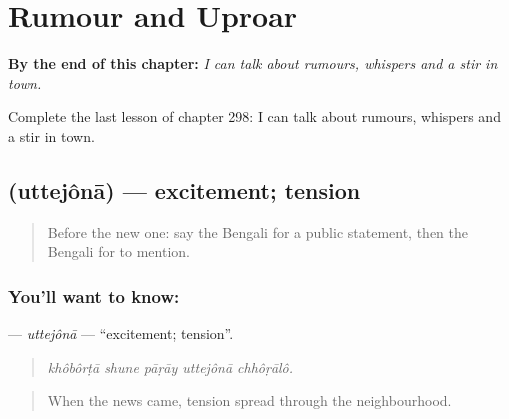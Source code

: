 
\chapter{Rumour and Uproar}
\label{ch:bn-rumour-and-uproar}

\begin{chapteropening}
\textbf{By the end of this chapter:} \emph{I can talk about rumours, whispers and a stir in town.}

Complete the last lesson of chapter 298: I can talk about rumours, whispers and a stir in town.
\end{chapteropening}

\section[\texorpdfstring{\bn{উত্তেজনা} (uttejônā)}{উত্তেজনা (uttejônā)}]{ (uttejônā) — excitement; tension}

\label{lesson:BN-C298-uttejona}



\begin{quote}
Before the new one: say the Bengali for a public statement, then the Bengali for to mention.
\end{quote}

\subsection*{You'll want to know: }
\textbf{} — \emph{uttejônā} — \textquotedblleft{}excitement; tension\textquotedblright{}.

\begin{quote}
    
\end{quote}

\begin{quote}
\emph{khôbôrṭā shune pāṛāy uttejônā chhôṛālô.}
\end{quote}

\begin{quote}
When the news came, tension spread through the neighbourhood.
\end{quote}

